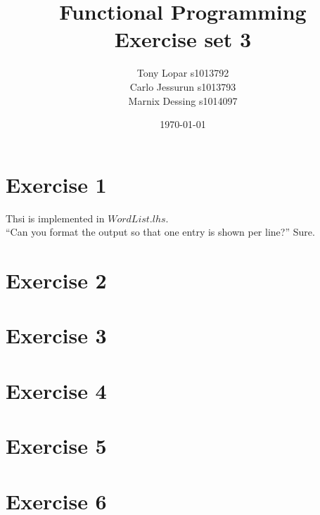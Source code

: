 \documentclass{article}
\begin{document}
\title{Functional Programming \\ Exercise set 3}
\date{\today}
\author{Tony Lopar s1013792 \\ Carlo Jessurun s1013793 \\ Marnix Dessing s1014097}
\maketitle

\section*{Exercise 1}
Thsi is implemented in $WordList.lhs$.\\
``Can you format the output so that one entry is shown per line?'' Sure.

\newpage
\section*{Exercise 2}

\newpage
\section*{Exercise 3}


\section*{Exercise 4}


\newpage
\section*{Exercise 5}

\section*{Exercise 6}
\end{document}
